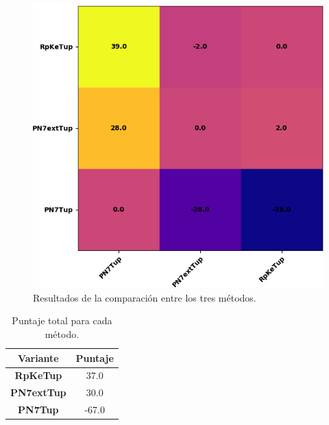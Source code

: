 \begin{figure}[hbtp]
    \centering
    \includegraphics[scale=.7]{Imagenes/prn7n8comp.png}
    \caption{Resultados de la comparación entre los tres métodos.}
    \label{fig:n7vsn8vspr}
\end{figure}

\begin{table}[hbtp]
    \centering
\begin{tabular}{@{}cc@{}}
Variante & Puntaje \\ \midrule
\toprule
    \textbf{RpKeTup} & 37.0 \\ \midrule
    \textbf{PN7extTup} & 30.0 \\ \midrule
    \textbf{PN7Tup} & -67.0 \\ \midrule
\end{tabular}
    \caption{Puntaje total para cada método.}
    \label{tab:n7n8pr}
\end{table}

